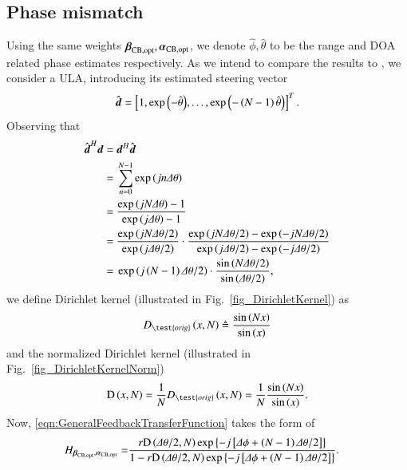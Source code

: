 \subsection{Phase mismatch}
Using the same weights $\boldsymbol{\beta}_{\text{CB,opt}},\boldsymbol{\alpha}_{\text{CB,opt}}$, we denote $\hat{\phi},\hat{\theta}$ to be the range and DOA related phase estimates respectively.
As we intend to compare the results to \cite{van2004optimum}, we consider a ULA, introducing its estimated steering vector
\begin{equation}\label{eq_est_d_ULA}
\hat{\boldsymbol{d}} = \left[{1, \exp{\left({-\hat{\theta}}\right)}, \hdots, \exp{\left({-\left({N-1}\right)\hat{\theta}}\right)}}\right]^{T}.
\end{equation}
Observing that
\begin{equation*}
    \begin{split}
        \hat{\vecnot{d}}^{H}\vecnot{d} =&\ \vecnot{d}^{H}\hat{\vecnot{d}}\\
        =&\ \sum_{n=0}^{N-1}\exp{\rBrace{jn\Delta\theta}} \\
        =&\ \frac{\exp{\rBrace{jN\Delta\theta}}-1}{\exp{\rBrace{j\Delta\theta}}-1}\\
        =&\ \frac{\exp{\rBrace{jN\Delta\theta/2}}}{\exp{\rBrace{j\Delta\theta/2}}}\cdot
        \frac{\exp{\rBrace{jN\Delta\theta/2}}-\exp{\rBrace{-jN\Delta\theta/2}}}
        {\exp{\rBrace{j\Delta\theta/2}}-\exp{\rBrace{-j\Delta\theta/2}}}\\
        =&\ \exp{\rBrace{j\rBrace{N-1}\Delta\theta/2}}\cdot
        \frac{\sin{\rBrace{N\Delta\theta/2}}}
        {\sin{\rBrace{\Delta\theta/2}}},
    \end{split}
\end{equation*}
we define Dirichlet kernel (illustrated in Fig.~\ref{fig_DirichletKernel}) as
\[
D_{\test{orig}}\rBrace{x,N}\triangleq\frac{\sin\rBrace{Nx}}{\sin\rBrace{x}}
\]
and the normalized Dirichlet kernel (illustrated in Fig.~\ref{fig_DirichletKernelNorm})
\[
\D{x}{N}=\frac{1}{N}D_{\test{orig}}\rBrace{x,N}=\frac{1}{N}\frac{\sin\rBrace{Nx}}{\sin\rBrace{x}}.
\]
Now, \eqref{eqn:GeneralFeedbackTransferFunction} takes the form of
\begin{equation}\label{eq:alpha_beta_hat}
    \begin{split}
        H_{\boldsymbol{\beta}_{\text{CB,opt}},\boldsymbol{\alpha}_{\text{CB,opt}}}
        = &\frac{r\text{D}\left({\Delta\theta/2,N}\right)\exp\left\{{-j\left[{\Delta\phi+\left({N-1}\right)\Delta\theta/2}\right]}\right\}}{1-r\text{D}\left({\Delta\theta/2,N}\right)\exp\left\{{-j\left[{\Delta\phi+\left({N-1}\right)\Delta\theta/2}\right]}\right\}}.
    \end{split}
\end{equation}
